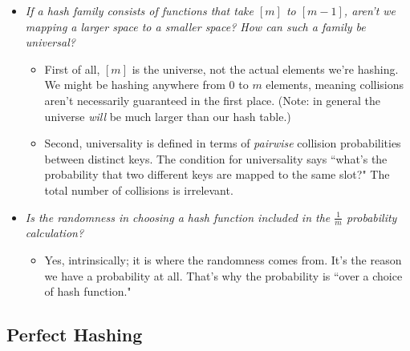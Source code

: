 \documentclass[11pt]{article}
\begin{document}
\begin{itemize}
\item \textit{If a hash family consists of functions that take $[m]$ to $[m - 1]$, aren't we mapping a larger space to a smaller space? How can such a family be universal?}
  \begin{itemize}
  \item First of all, $[m]$ is the universe, not the actual elements we're hashing. We might be hashing anywhere from $0$ to $m$ elements, meaning collisions aren't necessarily guaranteed in the first place. (Note: in general the universe \textit{will} be much larger than our hash table.)
  \item Second, universality is defined in terms of \textit{pairwise} collision probabilities between distinct keys. The condition for universality says ``what's the probability that two different keys are mapped to the same slot?" The total number of collisions is irrelevant.
  \end{itemize}

\item \textit{Is the randomness in choosing a hash function included in the $\frac{1}{m}$ probability calculation?}
  \begin{itemize}
  \item Yes, intrinsically; it is where the randomness comes from. It's the reason we have a probability at all. That's why the probability is ``over a choice of hash function."
  \end{itemize}
\end{itemize}

\subsection*{Perfect Hashing}
\end{document}
